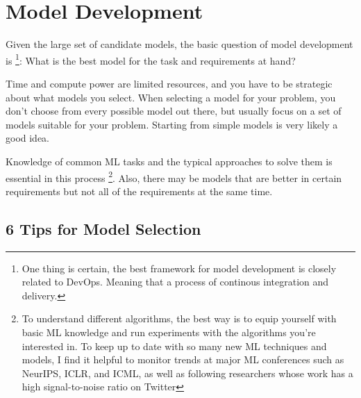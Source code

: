 \section{Model Development}
Given the large set of candidate models, the basic
question of model development is
\footnote{
    One thing is certain, the best framework for model
    development is closely related to DevOps. Meaning that
    a process of continous integration and delivery.
}: 
What is the best model for the task and requirements
at hand?

Time and compute power are limited resources,
and you have to be strategic about what models you
select. When selecting a model for your problem,
you don't choose from every possible model out there,
but usually focus on a set of models suitable for your
problem. Starting from simple models is very likely
a good idea.

Knowledge of common ML tasks and the typical approaches
to solve them is essential in this process
\footnote{
    To understand different algorithms, the best way is to
    equip yourself with basic ML knowledge and run experiments
    with the algorithms you're interested in. To keep up to
    date with so many new ML techniques and models, I find
    it helpful to monitor trends at major ML conferences
    such as NeurIPS, ICLR, and ICML, as well as following
    researchers whose work has a high signal-to-noise ratio
    on Twitter
}.
Also, there may be models that are better in certain
requirements but not all of the requirements at the same time.



\subsection{6 Tips for Model Selection}

